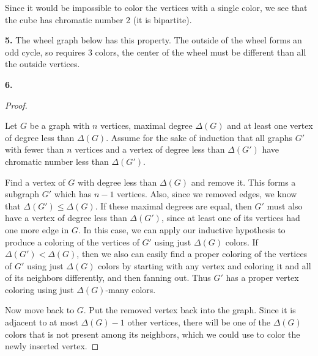 \documentclass[10pt,]{book}
\theoremstyle{plain}
\theoremstyle{definition}
\theoremstyle{definition}
\theoremstyle{definition}
\numberwithin{equation}{chapter}
\newcommand{\vtx}[2]{node[fill,circle,inner sep=0pt, minimum size=4pt,label=#1:#2]{}}
\renewcommand{\v}{\vtx{above}{}}
\newcommand{\lt}{ < }
\begin{document}
Since it would be impossible to color the vertices with a single color, we see that the cube has chromatic number 2 (it is bipartite).
%
\par\smallskip
\noindent\textbf{5.}\quad{}
The wheel graph below has this property. The outside of the wheel forms an odd cycle, so requires 3 colors, the center of the wheel must be different than all the outside vertices.
%
\leavevmode%
\begin{figure}
\centering
{
}
\end{figure}
\par\smallskip
\noindent\textbf{6.}\quad{}\begin{proof}\hypertarget{proof-61}{}

Let \(G\) be a graph with \(n\) vertices, maximal degree \(\Delta(G)\) and at least one vertex of degree less than \(\Delta(G)\). Assume for the sake of induction that all graphs \(G'\) with fewer than \(n\) vertices and a vertex of degree less than \(\Delta(G')\) have chromatic number less than \(\Delta(G')\).

		Find a vertex of \(G\) with degree less than \(\Delta(G)\) and remove it. This forms a subgraph \(G'\) which has \(n-1\) vertices. Also, since we removed edges, we know that \(\Delta(G') \le \Delta(G)\). If these maximal degrees are equal, then \(G'\) must also have a vertex of degree less than \(\Delta(G')\), since at least one of its vertices had one more edge in \(G\). In this case, we can apply our inductive hypothesis to produce a coloring of the vertices of \(G'\) using just \(\Delta(G)\) colors. If \(\Delta(G') \lt  \Delta(G)\), then we also can easily find a proper coloring of the vertices of \(G'\) using just \(\Delta(G)\) colors by starting with any vertex and coloring it and all of its neighbors differently, and then fanning out. Thus \(G'\) has a proper vertex coloring using just \(\Delta(G)\)-many colors.

		Now move back to \(G\). Put the removed vertex back into the graph. Since it is adjacent to at most \(\Delta(G) - 1\) other vertices, there will be one of the \(\Delta(G)\) colors that is not present among its neighbors, which we could use to color the newly inserted vertex.
%
\end{proof}
\par\smallskip
\end{document}
